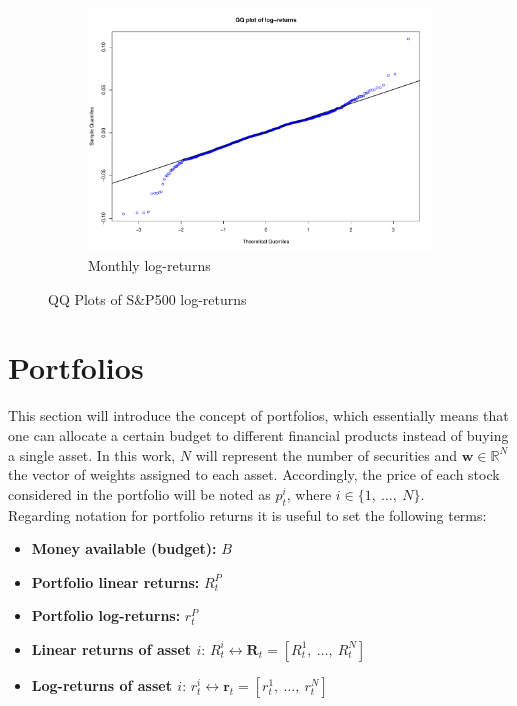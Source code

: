 \begin{figure}[hbtp]
	\begin{subfigure}{\textwidth}
		\centering
		\includegraphics[scale=.2]{img/finData/QQPlotMonthlyLogRet}
		\caption{Monthly log-returns}
	\end{subfigure}
	
	\caption{QQ Plots of S\&P500 log-returns}
	\label{fig:QQPlotLogRet}
\end{figure}

\newpage

\section{Portfolios}
This section will introduce the concept of portfolios, which essentially 
means that one can allocate a certain budget to different financial products 
instead of buying a single asset. In this work, $N$ will represent the 
number of securities and $\mathbf{w} \in \mathbb{R}^N$ the vector of weights 
assigned to each asset. Accordingly, the price of each stock considered in 
the portfolio will be noted as $p_t^i$, where $i \in \{1,\ \ldots ,\ N\}$.\\

Regarding notation for portfolio returns it is useful to set the following 
terms:
\begin{itemize}
	\item \textbf{Money available (budget):} $B$
	
	\item \textbf{Portfolio linear returns:}  $R_t^P$
	
	\item \textbf{Portfolio log-returns:} $r_t^P$
	
	\item \textbf{Linear returns of asset $i$}: $R_t^i \longleftrightarrow
	\textbf{R}_t = [ R_t^1 ,\ \ldots ,\ R_t^N ]$
	
	\item \textbf{Log-returns of asset $i$}: $r_t^i \longleftrightarrow 
	\textbf{r}_t = [ r_t^1 ,\ \ldots ,\ r_t^N ]$
\end{itemize}

